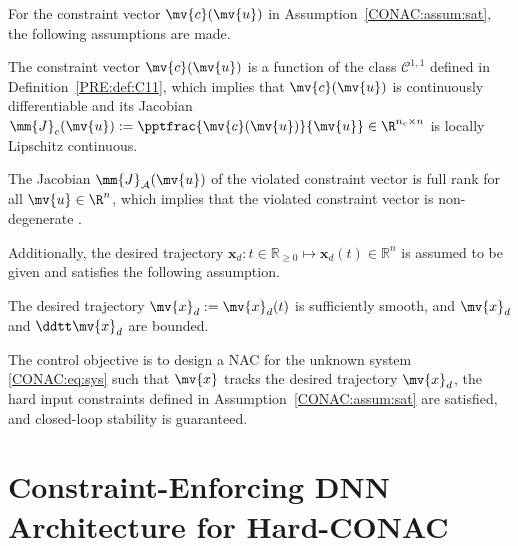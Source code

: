 For the constraint vector $\mv{c}(\mv{u})$ in Assumption~\ref{CONAC:assum:sat}, the following assumptions are made.

\begin{assum}
  \label{CONAC:assum:c:smooth}
  The constraint vector $\mv{c}(\mv{u})$ is a function of the class $\mathcal{C}^{1,1}$ defined in Definition~\ref{PRE:def:C11}, which implies that $\mv{c}(\mv{u})$ is continuously differentiable and its Jacobian $\mm{J}_c(\mv{u}):=\pptfrac{\mv{c}(\mv{u})}{\mv{u}}\in\R^{n_c\times n}$ is locally Lipschitz continuous.
\end{assum}

\begin{assum}
  \label{CONAC:assum:non:degeneracy}
  The Jacobian $\mm{J}_{\mathcal{A}}(\mv{u})$ of the violated constraint vector is full rank for all $\mv{u}\in\R^n$, which implies that the violated constraint vector is non-degenerate \cite[Chap. 16.4, pp. 465--467]{Nocedal:2006aa}.
\end{assum}

\par\medskip

Additionally, the desired trajectory 
$
  \boldsymbol{x}_d:
  t
  \in
  \mathbb{R}_{\geq 0}
  \mapsto
  \boldsymbol{x}_d(t)\in\mathbb{R}^n
$
is assumed to be given and satisfies the following assumption.

\begin{assum} 
  \label{CONAC:assum:xd}
  The desired trajectory $\mv{x}_d:=\mv{x}_d(t)$ is sufficiently smooth, and $\mv{x}_d$ and $\ddtt\mv{x}_d$ are bounded.
\end{assum}

The control objective is to design a NAC for the unknown system \eqref{CONAC:eq:sys} such that $\mv{x}$ tracks the desired trajectory $\mv{x}_d$, the hard input constraints defined in Assumption~\ref{CONAC:assum:sat} are satisfied, and closed-loop stability is guaranteed.


\section{Constraint-Enforcing DNN Architecture for Hard-CONAC}
\label{CONAC:sec:DNN:arch}

